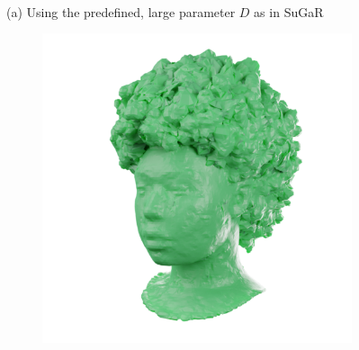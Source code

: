 \begin{figure}[tb]
\begin{subfigure}{0.19\linewidth}
  \end{subfigure}
  \vspace{0.005\linewidth}\\
  {\small (a) Using the predefined, large parameter $D$ as in SuGaR~\cite{guedon2023sugar}} 
  \\
  \begin{subfigure}{0.19\linewidth}
  \includegraphics[width=\linewidth]{images/meshes/khady_frosting.png}
  \end{subfigure}
  \hfill
  \begin{subfigure}{0.19\linewidth}

\end{subfigure}
\end{figure}
